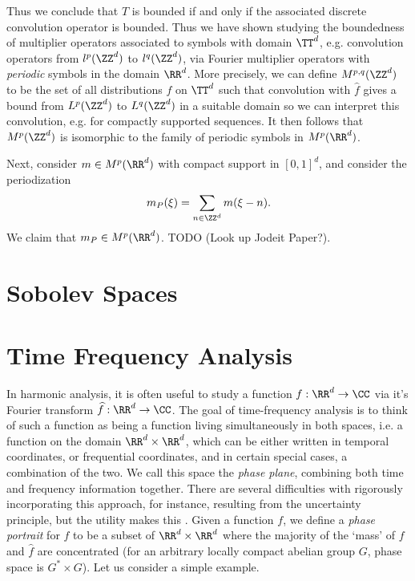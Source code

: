 \begin{example}
    Thus we conclude that $T$ is bounded if and only if the associated discrete convolution operator is bounded. Thus we have shown studying the boundedness of multiplier operators associated to symbols with domain $\TT^d$, e.g. convolution operators from $l^p(\ZZ^d)$ to $l^q(\ZZ^d)$, via Fourier multiplier operators with \emph{periodic} symbols in the domain $\RR^d$. More precisely, we can define $M^{p,q}(\ZZ^d)$ to be the set of all distributions $f$ on $\TT^d$ such that convolution with $\widehat{f}$ gives a bound from $L^p(\ZZ^d)$ to $L^q(\ZZ^d)$ in a suitable domain so we can interpret this convolution, e.g. for compactly supported sequences. It then follows that $M^p(\ZZ^d)$ is isomorphic to the family of periodic symbols in $M^p(\RR^d)$.
\end{example}

\begin{example}
    Next, consider $m \in M^p(\RR^d)$ with compact support in $[0,1]^d$, and consider the periodization
    \[ m_P(\xi) = \sum_{n \in \ZZ^d} m(\xi - n). \]
    We claim that $m_P \in M^p(\RR^d)$. TODO (Look up Jodeit Paper?).
\end{example}













\chapter{Sobolev Spaces}














\chapter{Time Frequency Analysis}

In harmonic analysis, it is often useful to study a function $f: \RR^d \to \CC$ via it's Fourier transform $\widehat{f}: \RR^d \to \CC$. The goal of time-frequency analysis is to think of such a function as being a function living simultaneously in both spaces, i.e. a function on the domain $\RR^d \times \RR^d$, which can be either written in temporal coordinates, or frequential coordinates, and in certain special cases, a combination of the two. We call this space the \emph{phase plane}, combining both time and frequency information together. There are several difficulties with rigorously incorporating this approach, for instance, resulting from the uncertainty principle, but the utility makes this . Given a function $f$, we define a \emph{phase portrait} for $f$ to be a subset of $\RR^d \times \RR^d$ where the majority of the `mass' of $f$ and $\widehat{f}$ are concentrated (for an arbitrary locally compact abelian group $G$, phase space is $G^* \times G$). Let us consider a simple example.

